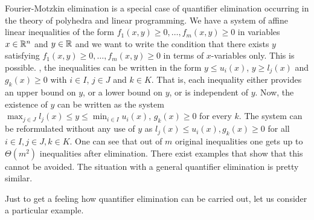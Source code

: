 \begin{remark}
	Fourier-Motzkin elimination is a special case of quantifier elimination occurring in the theory of polyhedra and linear programming. We have a system of affine linear inequalities of the form $f_1(x,y) \ge 0,\ldots,f_m(x,y) \ge 0$ in variables $x \in \mathbb{R}^n$ and $y \in \mathbb{R}$ and we want to write the condition that there exists  $y$ satisfying $f_1(x,y) \ge 0,\ldots, f_m(x,y) \ge 0$ in terms of $x$-variables only. This is possible. , the inequalities can be written in the form $y \le u_i(x)$, $y \ge l_j(x)$ and $g_k(x) \ge 0$ with $i \in I$, $j \in J$ and $k \in K$. That is, each inequality either provides an upper bound on $y$, or a lower bound on $y$, or is independent of $y$. Now, the existence of $y$ can be written as the system $\max_{j \in J} l_j(x) \le y \le \min_{i \in I} u_i(x)$, $g_k(x) \ge 0$ for every $k$. The system can be reformulated without any use of $y$ as $l_j(x) \le u_i(x), g_k(x) \ge 0$ for all $i \in I, j \in J, k \in K$. One can see that out of $m$ original inequalities one gets up to $\Theta(m^2)$ inequalities after elimination. There exist examples that show that this cannot be avoided. The situation with a general quantifier elimination is pretty similar. 
\end{remark}

Just to get a feeling how quantifier elimination can be carried out, let us consider a particular example. 

